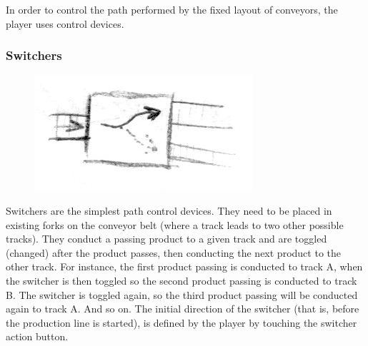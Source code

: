 \documentclass[a4paper]{scrartcl}
\begin{document}
    	In order to control the path performed by the fixed layout of conveyors, the player uses control devices.

        \subsubsection{Switchers}
            \begin{minipage}[t][7em][t]{\textwidth}
                \begin{figure}
                    \vspace{-20pt}
                    \includegraphics[scale=1]{devices/switcher}
                    \vspace{-15pt}
                \end{figure}

                Switchers are the simplest path control devices. They need to be placed in existing forks on the conveyor belt (where a track leads to two other possible tracks). They conduct a passing product to a given track and are toggled (changed) after the product passes, then conducting the next product to the other track. For instance, the first product passing is conducted to track A, when the switcher is then toggled so the second product passing is conducted to track B. The switcher is toggled again, so the third product passing will be conducted again to track A. And so on. The initial direction of the switcher (that is, before the production line is started), is defined by the player by touching the switcher action button.
            \end{minipage}
\end{document}
